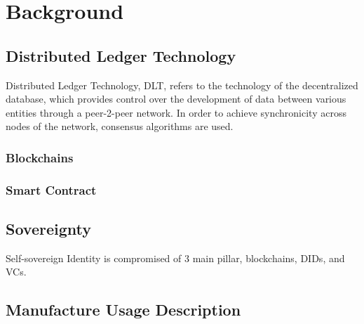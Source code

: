 \chapter{Background}
\label{chap:Background}


\section{Distributed Ledger Technology} %
\label{sec:Distributed Ledger Technology}

Distributed Ledger Technology, DLT, refers to the technology of the decentralized database, which provides control over
the development of data between various entities through a peer-2-peer network. In order to achieve synchronicity across
nodes of the network, consensus algorithms are used.


\subsection{Blockchains} %
\label{sub:Blockchains}


\subsection{Smart Contract} %
\label{sec:Smart Contract}


\section{Sovereignty} %
\label{sec:Sovereignty}

Self-sovereign Identity is compromised of 3 main pillar, blockchains, DIDs, and VCs.



\section{Manufacture Usage Description} %
\label{sec:Manufacture Usage Description}


